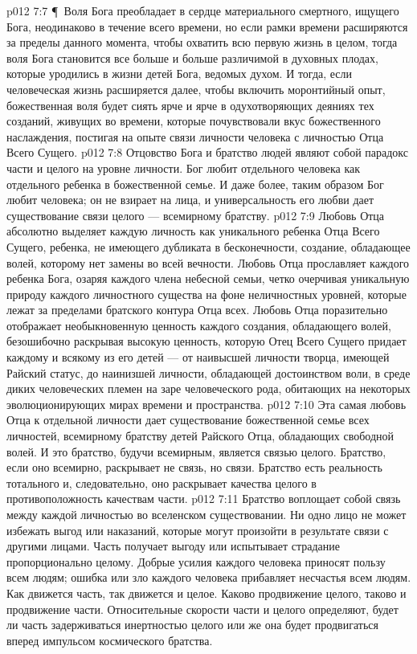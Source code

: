 \vs p012 7:7 \P\ Воля Бога преобладает в сердце материального смертного, ищущего Бога, неодинаково в течение всего времени, но если рамки времени расширяются за пределы данного момента, чтобы охватить всю первую жизнь в целом, тогда воля Бога становится все больше и больше различимой в духовных плодах, которые уродились в жизни детей Бога, ведомых духом. И тогда, если человеческая жизнь расширяется далее, чтобы включить моронтийный опыт, божественная воля будет сиять ярче и ярче в одухотворяющих деяниях тех созданий, живущих во времени, которые почувствовали вкус божественного наслаждения, постигая на опыте связи личности человека с личностью Отца Всего Сущего.
\vs p012 7:8 Отцовство Бога и братство людей являют собой парадокс части и целого на уровне личности. Бог любит  отдельного человека как отдельного ребенка в божественной семье. И даже более, таким образом Бог любит  человека; он не взирает на лица, и универсальность его любви дает существование связи целого --- всемирному братству.
\vs p012 7:9 Любовь Отца абсолютно выделяет каждую личность как уникального ребенка Отца Всего Сущего, ребенка, не имеющего дубликата в бесконечности, создание, обладающее волей, которому нет замены во всей вечности. Любовь Отца прославляет каждого ребенка Бога, озаряя каждого члена небесной семьи, четко очерчивая уникальную природу каждого личностного существа на фоне неличностных уровней, которые лежат за пределами братского контура Отца всех. Любовь Отца поразительно отображает необыкновенную ценность каждого создания, обладающего волей, безошибочно раскрывая высокую ценность, которую Отец Всего Сущего придает каждому и всякому из его детей --- от наивысшей личности творца, имеющей Райский статус, до наинизшей личности, обладающей достоинством воли, в среде диких человеческих племен на заре человеческого рода, обитающих на некоторых эволюционирующих мирах времени и пространства.
\vs p012 7:10 Эта самая любовь Отца к отдельной личности дает существование божественной семье всех личностей, всемирному братству детей Райского Отца, обладающих свободной волей. И это братство, будучи всемирным, является связью целого. Братство, если оно всемирно, раскрывает не  связь, но  связи. Братство есть реальность тотального и, следовательно, оно раскрывает качества целого в противоположность качествам части.
\vs p012 7:11 Братство воплощает собой связь между каждой личностью во вселенском существовании. Ни одно лицо не может избежать выгод или наказаний, которые могут произойти в результате связи с другими лицами. Часть получает выгоду или испытывает страдание пропорционально целому. Добрые усилия каждого человека приносят пользу всем людям; ошибка или зло каждого человека прибавляет несчастья всем людям. Как движется часть, так движется и целое. Каково продвижение целого, таково и продвижение части. Относительные скорости части и целого определяют, будет ли часть задерживаться инертностью целого или же она будет продвигаться вперед импульсом космического братства.
